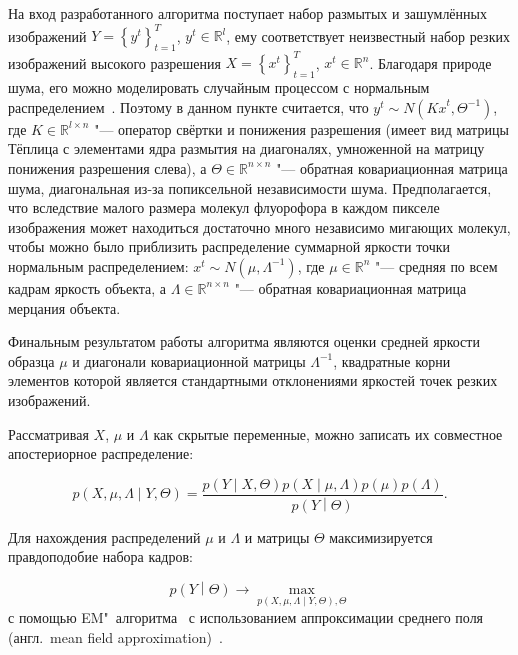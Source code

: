 На вход разработанного алгоритма поступает набор размытых и зашумлённых изображений $Y=\left\{y^t\right\}_{t=1}^T$, $y^t\in\mathbb{R}^l$, ему соответствует неизвестный набор резких изображений высокого разрешения $X=\left\{x^t\right\}_{t=1}^T$, $x^t\in\mathbb{R}^n$. Благодаря природе шума, его можно моделировать случайным процессом с нормальным распределением~\cite{gadsden1965some}. Поэтому в данном пункте считается, что $y^t \sim N({Kx}^t,\Theta^{-1})$, где $K\in\mathbb{R}^{l \times n}$ "--- оператор свёртки и понижения разрешения (имеет вид матрицы Тёплица с элементами ядра размытия на диагоналях, умноженной на матрицу понижения разрешения слева), а $\Theta\in\mathbb{R}^{n \times n}$ "--- обратная ковариационная матрица шума, диагональная из-за попиксельной независимости шума. Предполагается, что вследствие малого размера молекул флуорофора в каждом пикселе изображения может находиться достаточно много независимо мигающих молекул, чтобы можно было приблизить распределение суммарной яркости точки нормальным распределением: $x^t \sim N(\mu,\Lambda^{-1})$, где $\mu\in\mathbb{R}^n$ "--- средняя по всем кадрам яркость объекта, а $\Lambda\in\mathbb{R}^{n \times n}$ "--- обратная ковариационная матрица мерцания объекта.

Финальным результатом работы алгоритма являются оценки средней яркости образца $\mu$ и диагонали ковариационной матрицы $\Lambda^{-1}$, квадратные корни элементов которой является стандартными отклонениями яркостей точек резких изображений.

Рассматривая $X$, $\mu$ и $\Lambda$ как скрытые переменные, можно записать их совместное апостериорное распределение:

\begin{equation*}
	p\left(X,\mu,\Lambda\middle|Y,\Theta\right)=\frac{p\left(Y\middle|X,\Theta\right)p\left(X\middle|\mu,\Lambda\right)p\left(\mu\right)p\left(\Lambda\right)}{p\left(Y\middle|\Theta\right)}.
\end{equation*}

Для нахождения распределений $\mu$ и $\Lambda$ и матрицы $\Theta$ максимизируется правдоподобие набора кадров:

\begin{equation*}
	p\left(Y\middle|\Theta\right) \rightarrow \max_{p \left( X, \mu, \Lambda \middle| Y,\Theta \right),\Theta}
\end{equation*}
с помощью EM"~алгоритма~\cite{477e7e2b-4ded-3369-981e-9b40850a2701} с использованием аппроксимации среднего поля (англ.~mean field approximation)~\cite{bishop2006pattern}.

